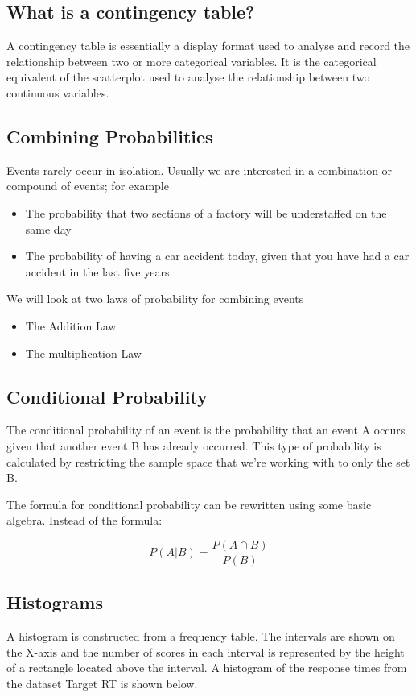 \subsection*{What is a contingency table?}

A contingency table is essentially a display format used to analyse and record the relationship between two or more categorical variables. It is the categorical equivalent of the scatterplot used to analyse the relationship between two continuous variables.

\subsection{Combining Probabilities}

Events rarely occur in isolation. Usually we are interested in a combination or compound of events; for example
\begin{itemize}
\item The probability that two sections of a factory will be understaffed on the same day 
\item The probability of having a car accident today, given that you have had a car accident in the last five years.
\end{itemize}	

We will look at two laws of probability for combining events
\begin{itemize}
\item The Addition Law 
\item The multiplication Law
\end{itemize}	


\subsection{Conditional Probability}
The conditional probability of an event is the probability that an event A occurs given that another event B has already occurred. This type of probability is calculated by restricting the sample space that we’re working with to only the set B.

The formula for conditional probability can be rewritten using some basic algebra. Instead of the formula:

\[P(A | B) = \frac{P(A \cap B) }{P( B )}  \]


\subsection{Histograms}
A histogram is constructed from a frequency table. The intervals are shown on the X-axis and the number of scores in each interval is represented by the height of a rectangle located above the interval. A histogram of the response times from the dataset Target RT is shown below.



